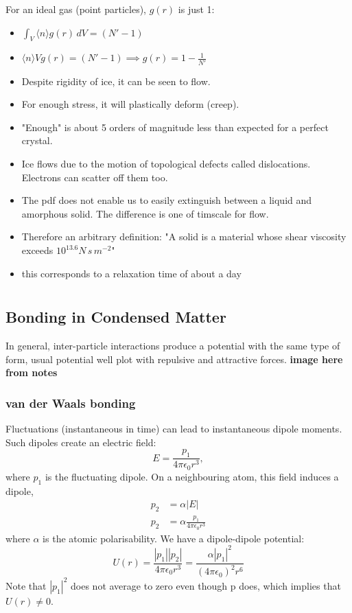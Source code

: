 \documentclass[a4paper, 11pt, normalem]{report}
\begin{document}
For an ideal gas (point particles), $g(r)$ is just 1:
\begin{itemize}
    \item $\int_V \langle n \rangle g(r)\,dV = (N' - 1)$
    \item $\langle n \rangle V g(r) = (N' - 1) \implies g(r) = 1 - \frac{1}{N'}$
    \item Despite rigidity of ice, it can be seen to flow.
    \item For enough stress, it will plastically deform (creep).
    \item "Enough" is about 5 orders of magnitude less than expected for a perfect crystal.
    \item Ice flows due to the motion of topological defects called dislocations. Electrons can scatter off them too.
    \item The pdf does not enable us to easily extinguish between a liquid and amorphous solid. The difference is one of timscale for flow.
    \item Therefore an arbitrary definition: "A solid is a material whose shear viscosity exceeds $10^{13.6} N\,s\,m^{-2}$"
    \item this corresponds to a relaxation time of about a day
\end{itemize}

\chapter{}

\section{Bonding in Condensed Matter}
In general, inter-particle interactions produce a potential with the same type of form, usual potential well plot with repulsive and attractive forces.
\textbf{image here from notes}

\subsection{van der Waals bonding}

Fluctuations (instantaneous in time) can lead to instantaneous dipole moments.
Such dipoles create an electric field:
\begin{equation}
    E = \frac{p_1}{4\pi\epsilon_0 r^3},
\end{equation}
where $p_1$ is the fluctuating dipole.
On a neighbouring atom, this field induces a dipole,
\begin{align}
    p_2 &= \alpha|E| \\
    p_2 &= \alpha \frac{p_1}{4\pi\epsilon_0 r^3}
\end{align}
where $\alpha$ is the atomic polarisability.
We have a dipole-dipole potential:
\begin{equation}
    U(r) = \frac{|p_1||p_2|}{4\pi\epsilon_0 r^3} = \frac{\alpha|p_1|^2}{(4\pi\epsilon_0)^2r^6}
\end{equation}
Note that $|p_1|^2$ does not average to zero even though p does, which implies that $U(r) \neq 0$.
\end{document}

